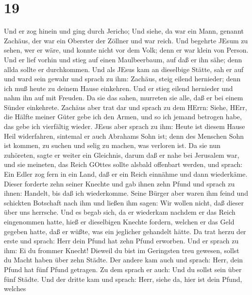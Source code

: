 \hypertarget{section-18}{%
\section{19}\label{section-18}}

 Und er zog hinein und ging durch Jericho;  Und
siehe, da war ein Mann, genannt Zachäus, der war ein Oberster der
Zöllner und war reich.  Und begehrte JEsum zu sehen, wer er
wäre, und konnte nicht vor dem Volk; denn er war klein von Person.
 Und er lief vorhin und stieg auf einen Maulbeerbaum, auf
daß er ihn sähe; denn allda sollte er durchkommen.  Und als
JEsus kam an dieselbige Stätte, sah er auf und ward sein gewahr und
sprach zu ihm: Zachäus, steig eilend hernieder; denn ich muß heute zu
deinem Hause einkehren.  Und er stieg eilend hernieder und
nahm ihn auf mit Freuden.  Da sie das sahen, murreten sie
alle, daß er bei einem Sünder einkehrete.  Zachäus aber trat
dar und sprach zu dem HErrn: Siehe, HErr, die Hälfte meiner Güter gebe
ich den Armen, und so ich jemand betrogen habe, das gebe ich vierfältig
wieder.  JEsus aber sprach zu ihm: Heute ist diesem Hause
Heil widerfahren, sintemal er auch Abrahams Sohn ist;  denn
des Menschen Sohn ist kommen, zu suchen und selig zu machen, was
verloren ist.  Da sie nun zuhöreten, sagte er weiter ein
Gleichnis, darum daß er nahe bei Jerusalem war, und sie meineten, das
Reich GOttes sollte alsbald offenbart werden,  und sprach:
Ein Edler zog fern in ein Land, daß er ein Reich einnähme und dann
wiederkäme.  Dieser forderte zehn seiner Knechte und gab
ihnen zehn Pfund und sprach zu ihnen: Handelt, bis daß ich wiederkomme.
 Seine Bürger aber waren ihm feind und schickten Botschaft
nach ihm und ließen ihm sagen: Wir wollen nicht, daß dieser über uns
herrsche.  Und es begab sich, da er wiederkam nachdem er
das Reich eingenommen hatte, hieß er dieselbigen Knechte fordern,
welchen er das Geld gegeben hatte, daß er wüßte, was ein jeglicher
gehandelt hätte.  Da trat herzu der erste und sprach: Herr
dein Pfund hat zehn Pfund erworben.  Und er sprach zu ihm:
Ei du frommer Knecht! Dieweil du bist im Geringsten treu gewesen, sollst
du Macht haben über zehn Städte.  Der andere kam auch und
sprach: Herr, dein Pfund hat fünf Pfund getragen.  Zu dem
sprach er auch: Und du sollst sein über fünf Städte.  Und
der dritte kam und sprach: Herr, siehe da, hier ist dein Pfund, welches
